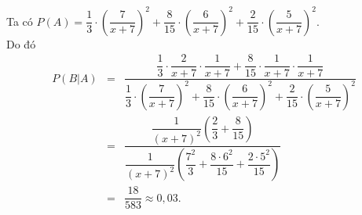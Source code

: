 \begin{ex}
{{    }
    Ta có $P(A)=\dfrac{1}{3}\cdot \left(\dfrac{7}{x+7}\right)^2+\dfrac{8}{15}\cdot \left(\dfrac{6}{x+7}\right)^2+\dfrac{2}{15}\cdot \left(\dfrac{5}{x+7}\right)^2$.\\
    Do đó 
    \begin{eqnarray*}
        P\left(B|A\right)&=&\dfrac{\dfrac{1}{3}\cdot \dfrac{2}{x+7}\cdot \dfrac{1}{x+7}+\dfrac{8}{15}\cdot \dfrac{1}{x+7}\cdot \dfrac{1}{x+7}}{\dfrac{1}{3}\cdot \left(\dfrac{7}{x+7}\right)^2+\dfrac{8}{15}\cdot \left(\dfrac{6}{x+7}\right)^2+\dfrac{2}{15}\cdot \left(\dfrac{5}{x+7}\right)^2}\\
        &=&\dfrac{\dfrac{1}{(x+7)^2}\left(\dfrac{2}{3}+\dfrac{8}{15}\right)}{\dfrac{1}{(x+7)^2}\left(\dfrac{7^2}{3}+\dfrac{8\cdot 6^2}{15}+\dfrac{2\cdot 5^2}{15}\right)}\\
        &=&\dfrac{18}{583}\approx 0{,}03.
    \end{eqnarray*}
}
\end{ex}
